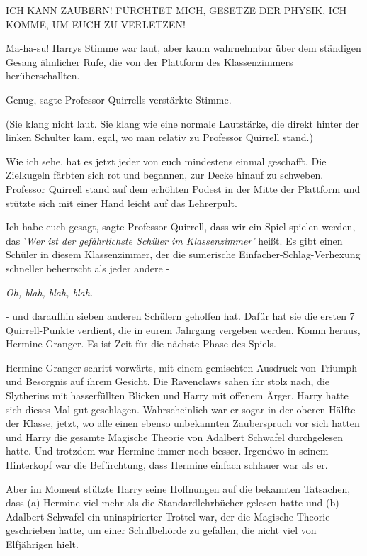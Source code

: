 ICH KANN ZAUBERN! FÜRCHTET MICH, GESETZE DER PHYSIK, ICH KOMME, UM EUCH ZU
VERLETZEN!

\glqq Ma-ha-su!\grqq{} Harrys Stimme war laut, aber kaum wahrnehmbar über dem
ständigen Gesang ähnlicher Rufe, die von der Plattform des Klassenzimmers
herüberschallten.

\glqq Genug\grqq{}, sagte Professor Quirrells verstärkte Stimme.

(Sie klang nicht laut. Sie klang wie eine normale Lautstärke, die direkt hinter
der linken Schulter kam, egal, wo man relativ zu Professor Quirrell stand.)

\glqq Wie ich sehe, hat es jetzt jeder von euch mindestens einmal
geschafft.\grqq{} Die Zielkugeln färbten sich rot und begannen, zur Decke hinauf
zu schweben. Professor Quirrell stand auf dem erhöhten Podest in der Mitte der
Plattform und stützte sich mit einer Hand leicht auf das Lehrerpult.

\glqq Ich habe euch gesagt\grqq{}, sagte Professor Quirrell, \glqq dass wir ein
Spiel spielen werden, das '\emph{Wer ist der gefährlichste Schüler im
Klassenzimmer'} heißt. Es gibt einen Schüler in diesem Klassenzimmer, der die
sumerische Einfacher-Schlag-Verhexung schneller beherrscht als jeder andere
-\grqq{}

\emph{Oh, blah, blah, blah.}

\glqq - und daraufhin sieben anderen Schülern geholfen hat. Dafür hat sie die
ersten 7 Quirrell-Punkte verdient, die in eurem Jahrgang vergeben werden. Komm
heraus, Hermine Granger. Es ist Zeit für die nächste Phase des Spiels.\grqq{}

Hermine Granger schritt vorwärts, mit einem gemischten Ausdruck von Triumph und
Besorgnis auf ihrem Gesicht. Die Ravenclaws sahen ihr stolz nach, die Slytherins
mit hasserfüllten Blicken und Harry mit offenem Ärger. Harry hatte sich dieses
Mal gut geschlagen. Wahrscheinlich war er sogar in der oberen Hälfte der Klasse,
jetzt, wo alle einen ebenso unbekannten Zauberspruch vor sich hatten und Harry
die gesamte Magische Theorie von Adalbert Schwafel durchgelesen hatte. Und
trotzdem war Hermine immer noch besser. Irgendwo in seinem Hinterkopf war die
Befürchtung, dass Hermine einfach schlauer war als er.

Aber im Moment stützte Harry seine Hoffnungen auf die bekannten Tatsachen, dass
(a) Hermine viel mehr als die Standardlehrbücher gelesen hatte und (b) Adalbert
Schwafel ein uninspirierter Trottel war, der die Magische Theorie geschrieben
hatte, um einer Schulbehörde zu gefallen, die nicht viel von Elfjährigen hielt.

